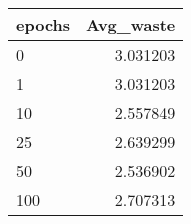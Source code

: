 \begin{tabular}{lr}
\toprule
epochs &  Avg\_waste \\
\midrule
     0 &   3.031203 \\
     1 &   3.031203 \\
    10 &   2.557849 \\
    25 &   2.639299 \\
    50 &   2.536902 \\
   100 &   2.707313 \\
\bottomrule
\end{tabular}

